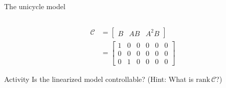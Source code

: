 \documentclass[presentation,aspectratio=169]{beamer}
\begin{document}
\begin{frame}[label={sec:orgc902816}]{The unicycle model}
\begin{columns}
\begin{column}{0.6\columnwidth}
\pause

\begin{align*} \mathcal{C} &= \begin{bmatrix} B & AB & A^2B \end{bmatrix}\\
&= \begin{bmatrix} 1 & 0 & 0 & 0 & 0 & 0 \\ 0 & 0 & 0 & 0 & 0 & 0\\ 0 & 1 & 0 & 0 & 0 & 0\end{bmatrix}
\end{align*}

\pause

\alert{Activity} Is the linearized model controllable? (Hint: What is \(\text{rank}\, \mathcal{C}\)?)
\end{column}
\end{columns}
\end{frame}
\end{document}
